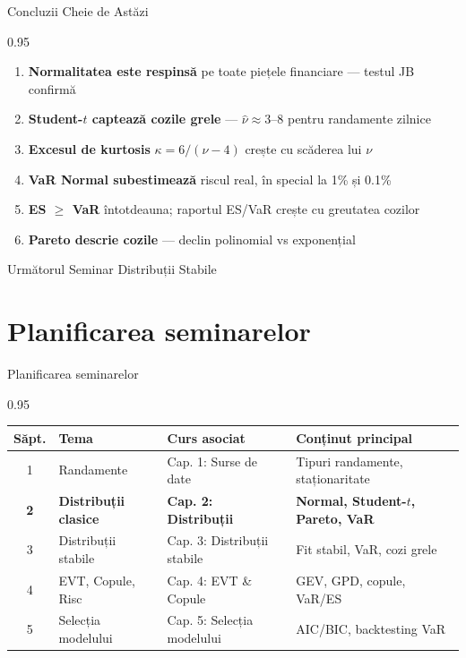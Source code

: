 \documentclass[9pt, aspectratio=169, t]{beamer}
\begin{document}
\begin{frame}{Concluzii Cheie de Astăzi}
\begin{cminipage}{0.95\textwidth}
    \begin{enumerate}\setlength{\itemsep}{0pt}
        \item \textbf{Normalitatea este respinsă} pe toate piețele financiare --- testul JB confirmă
        \item \textbf{Student-$t$ captează cozile grele} --- $\hat{\nu} \approx 3$--$8$ pentru randamente zilnice
        \item \textbf{Excesul de kurtosis} $\kappa = 6/(\nu-4)$ crește cu scăderea lui $\nu$
        \item \textbf{VaR Normal subestimează} riscul real, în special la 1\% și 0.1\%
        \item \textbf{ES $\geq$ VaR} întotdeauna; raportul ES/VaR crește cu greutatea cozilor
        \item \textbf{Pareto descrie cozile} --- declin polinomial vs exponențial
    \end{enumerate}

    \vspace{0.3cm}
    \begin{block}{Următorul Seminar}
        Distribuții Stabile
    \end{block}
\end{cminipage}
\end{frame}

\section{Planificarea seminarelor}

\begin{frame}{Planificarea seminarelor}
    \begin{cminipage}{0.95\textwidth}
\renewcommand{\arraystretch}{1.3}
\begin{center}
\begin{tabular}{clll}
\toprule
\textbf{Săpt.} & \textbf{Tema} & \textbf{Curs asociat} & \textbf{Conținut principal} \\
\midrule
1 & Randamente & Cap. 1: Surse de date & Tipuri randamente, staționaritate \\
\rowcolor{MainBlue!10}
\textbf{2} & \textbf{Distribuții clasice} & \textbf{Cap. 2: Distribuții} & \textbf{Normal, Student-$t$, Pareto, VaR} \\
3 & Distribuții stabile & Cap. 3: Distribuții stabile & Fit stabil, VaR, cozi grele \\
4 & EVT, Copule, Risc & Cap. 4: EVT \& Copule & GEV, GPD, copule, VaR/ES \\
5 & Selecția modelului & Cap. 5: Selecția modelului & AIC/BIC, backtesting VaR \\
\bottomrule
\end{tabular}
\end{center}
    \end{cminipage}
\end{frame}
\end{document}

